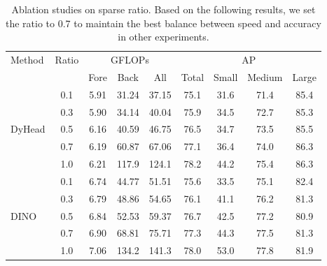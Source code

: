 \begin{table}
\centering
\caption{Ablation studies on sparse ratio. Based on the following results, we set the ratio to 0.7 to maintain the best balance between speed and accuracy in other experiments.} 
\vspace{-10pt}
\setlength\tabcolsep{2.2pt}
\begin{tabular}{l|c|*{3}{c}|*{4}{c}}
\hline
\multirow{2}{*}{Method} & \multirow{2}{*}{Ratio} & \multicolumn{3}{c|}{GFLOPs} & \multicolumn{4}{c}{AP}         \\ \cline{3-9} 
                        &                        & Fore   & Back     & All     & Total & Small & Medium & Large \\ \hline
                        & 0.1                & 5.91   & 31.24    & 37.15   & 75.1 & 31.6 & 71.4  & 85.4 \\
                        & 0.3                & 5.90   & 34.14    & 40.04   & 75.9 & 34.5 & 72.7  & 85.3 \\
DyHead                  & 0.5                & 6.16   & 40.59    & 46.75   & 76.5 & 34.7 & 73.5  & 85.5 \\
                        & 0.7                & 6.19   & 60.87    & 67.06   & 77.1 & 36.4 & 74.0  & 86.3 \\
                        & 1.0                & 6.21   & 117.9   & 124.1  & 78.2 & 44.2 & 75.4  & 86.3 \\ \hline
                        & 0.1                & 6.74   & 44.77    & 51.51   & 75.6 & 33.5 & 75.1  & 82.4 \\
                        & 0.3                & 6.79   & 48.86    & 54.65   & 76.1 & 41.1 & 76.2  & 81.3 \\
DINO                    & 0.5                & 6.84   & 52.53    & 59.37   & 76.7 & 42.5 & 77.2  & 80.9 \\
                        & 0.7                & 6.90   & 68.81    & 75.71   & 77.3 & 44.3 & 77.5  & 81.3 \\
                        & 1.0                & 7.06   & 134.2   & 141.3  & 78.0 & 53.0 & 77.8  & 81.9 \\ \hline
\end{tabular}
\label{tab:sparse_ratio}
\end{table}






